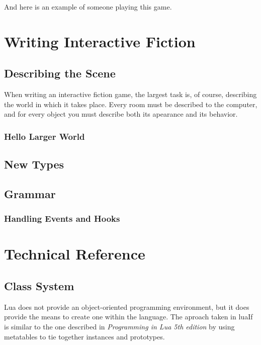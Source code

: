 \documentclass{book}
\begin{document}
%

And here is an example of someone playing this game.

%

\chapter{Writing Interactive Fiction}

\section{Describing the Scene}

When writing an interactive fiction game, the largest task is, of
course, describing the world in which it takes place. Every room must
be described to the computer, and for every object you must describe
both its apearance and its behavior.

\subsection{Hello Larger World}

\section{New Types}

\section{Grammar}

\subsection{Handling Events and Hooks}
\label{section:handlingEventsAndHooks}


\chapter{Technical Reference}

\section{Class System}

Lua does not provide an object-oriented programming environment, but
it does provide the means to create one within the language. The
aproach taken in luaIf is similar to the one described in
\textit{Programming in Lua 5th edition} by using metatables to tie
together instances and prototypes.
\end{document}
